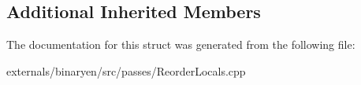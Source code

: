 \subsection*{Additional Inherited Members}


The documentation for this struct was generated from the following file\+:\begin{DoxyCompactItemize}
\item 
externals/binaryen/src/passes/Reorder\+Locals.\+cpp\end{DoxyCompactItemize}
